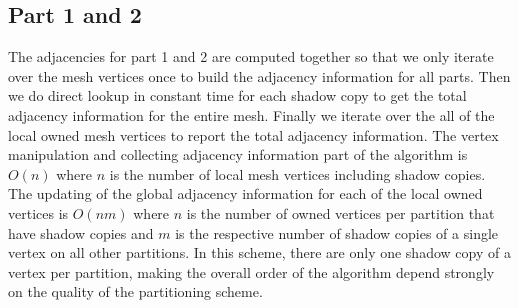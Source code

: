 \documentclass{article}
\begin{document}
\FloatBarrier
\restoregeometry

\subsection{Part 1 and 2}
The adjacencies for part 1 and 2 are computed together so that we only iterate over the mesh vertices once to build the adjacency information for all parts. Then we do direct lookup in constant time for each shadow copy to get the total adjacency information for the entire mesh. Finally we iterate over the all of the local owned mesh vertices to report the total adjacency information. The vertex manipulation and collecting adjacency information part of the algorithm is $O(n)$ where $n$ is the number of local mesh vertices including shadow copies. The updating of the global adjacency information for each of the local owned vertices is $O(nm)$ where $n$ is the number of owned vertices per partition that have shadow copies and $m$ is the respective number of shadow copies of a single vertex on all other partitions. In this scheme, there are only one shadow copy of a vertex per partition, making the overall order of the algorithm depend strongly on the quality of the partitioning scheme.
\end{document}
